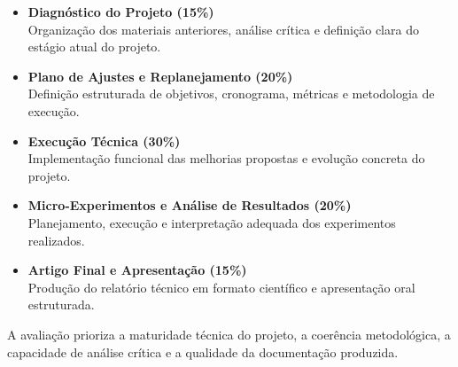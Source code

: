 \begin{itemize}
    \item \textbf{Diagnóstico do Projeto (15\%)} \\
    Organização dos materiais anteriores, análise crítica e definição clara do estágio atual do projeto.

    \item \textbf{Plano de Ajustes e Replanejamento (20\%)} \\
    Definição estruturada de objetivos, cronograma, métricas e metodologia de execução.

    \item \textbf{Execução Técnica (30\%)} \\
    Implementação funcional das melhorias propostas e evolução concreta do projeto.

    \item \textbf{Micro-Experimentos e Análise de Resultados (20\%)} \\
    Planejamento, execução e interpretação adequada dos experimentos realizados.

    \item \textbf{Artigo Final e Apresentação (15\%)} \\
    Produção do relatório técnico em formato científico e apresentação oral estruturada.
\end{itemize}

A avaliação prioriza a maturidade técnica do projeto, a coerência metodológica, a capacidade de análise crítica e a qualidade da documentação produzida.
